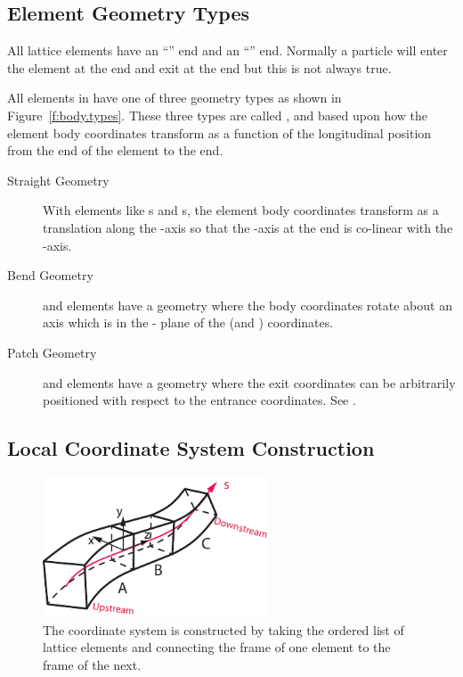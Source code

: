 \documentclass{hitec}
\begin{document}
\subsection{Element Geometry Types}

All lattice elements have an ``'' end and an ``'' end. Normally a particle
will enter the element at the  end and exit at the  end but this is not always
true.

All elements in \bmad have one of three geometry types as shown in Figure~\ref{f:body.types}.  These
three types are called ,  and  based upon how the element body
coordinates transform as a function of the longitudinal  position from the  end
of the element to the  end.
\begin{description}
\item[Straight Geometry] \Newline
With  elements like s and s, the element body coordinates
transform as a translation along the -axis so that the -axis at the  end is
co-linear with the  -axis.
\item[Bend Geometry] \Newline
{} and  elements have a  geometry where the body coordinates rotate
about an axis which is in the - plane of the  (and ) coordinates.
\item[Patch Geometry] \Newline 
{} and  elements have a  geometry where the exit coordinates can
be arbitrarily positioned with respect to the entrance coordinates. See .
\end{description}

\subsection{Local Coordinate System Construction}

\begin{figure}[tb]
  \centering
  \includegraphics[width=0.6\textwidth]{element-stream.pdf}
  \caption{The  coordinate system is constructed by taking the ordered list of lattice elements and
connecting the  frame of one element to the  frame of the next.}
  \label{f:leggo}
\end{figure}
\end{document}
